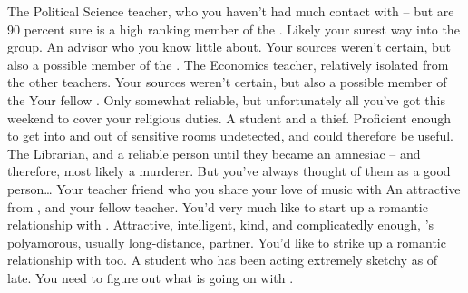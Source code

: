 \documentclass[char]{GL2020}
\begin{document}
\begin{itemz}[Notes]
	\item 
\end{itemz}

\begin{contacts}
	\contact{\cChupInventor{}} The Political Science teacher, who you haven’t had much contact with -- but are 90 percent sure is a high ranking member of the \pGoaties{}. Likely your surest way into the group.
\contact{\cWildCard{}} An advisor who you know little about. Your sources weren’t certain, but also a possible member of the \pGoaties{}. 
	\contact{\cChupSecond{}} The Economics teacher, relatively isolated from the other teachers. Your sources weren’t certain, but also a possible member of the \pGoaties{}
	\contact{\cHedonist{}} Your fellow \pFarm{} \cHedonist{\cleric}. Only somewhat reliable, but unfortunately all you’ve got this weekend to cover your religious duties. 
	\contact{\cPirateChild{}} A student and a thief. Proficient enough to get into and out of sensitive rooms undetected, and could therefore be useful.  
	\contact{\cLibrarian{}} The Librarian, and a reliable person until they became an amnesiac -- and therefore, most likely a murderer. But you’ve always thought of them as a good person\ldots 
	\contact{\cMusic{}} Your teacher friend who you share your love of music with 
\contact{\cBeetle{}} An attractive \cBeetle{\cleric} from \pTech{}, and your fellow teacher. You’d very much like to start up a romantic relationship with \cBeetle{\them}.
	\contact{\cJuniorStatesman{}} Attractive, intelligent, kind, and complicatedly enough, \cBeetle{}’s polyamorous, usually long-distance, partner. You’d like to strike up a romantic relationship with \cJuniorStatesman{\them} too.
	\contact{\cLibAssist{}} A \cFarm{} student who has been acting extremely sketchy as of late. You need to figure out what is going on with \cLibAssist{\them}.
\end{contacts}
\end{document}
